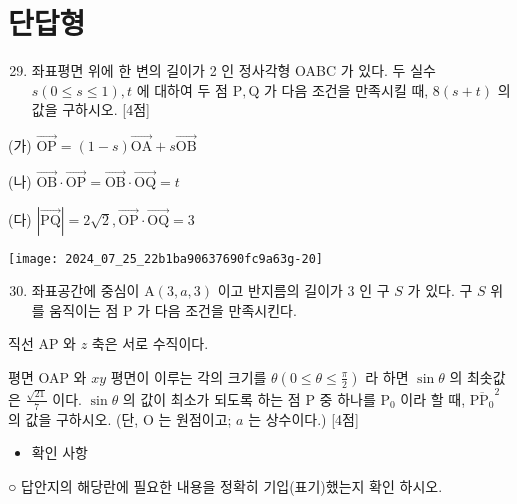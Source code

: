 \documentclass[10pt]{article}
\begin{document}
\section*{단답형}
\begin{enumerate}
  \setcounter{enumi}{28}
  \item 좌표평면 위에 한 변의 길이가 2 인 정사각형 OABC 가 있다. 두 실수 $s(0 \leq s \leq 1), t$ 에 대하여 두 점 $\mathrm{P}, \mathrm{Q}$ 가 다음 조건을 만족시킬 때, $8(s+t)$ 의 값을 구하시오. [4점]
\end{enumerate}

(가) $\overrightarrow{\mathrm{OP}}=(1-s) \overrightarrow{\mathrm{OA}}+s \overrightarrow{\mathrm{OB}}$

(나) $\overrightarrow{\mathrm{OB}} \cdot \overrightarrow{\mathrm{OP}}=\overrightarrow{\mathrm{OB}} \cdot \overrightarrow{\mathrm{OQ}}=t$

(다) $|\overrightarrow{\mathrm{PQ}}|=2 \sqrt{2}, \overrightarrow{\mathrm{OP}} \cdot \overrightarrow{\mathrm{OQ}}=3$

\begin{center}
\texttt{[image: 2024\_07\_25\_22b1ba90637690fc9a63g-20]}
\end{center}

\begin{enumerate}
  \setcounter{enumi}{29}
  \item 좌표공간에 중심이 $\mathrm{A}(3, a, 3)$ 이고 반지름의 길이가 3 인 구 $S$ 가 있다. 구 $S$ 위를 움직이는 점 P 가 다음 조건을 만족시킨다.
\end{enumerate}

직선 AP 와 $z$ 축은 서로 수직이다.

평면 OAP 와 $x y$ 평면이 이루는 각의 크기를 $\theta\left(0 \leq \theta \leq \frac{\pi}{2}\right)$ 라 하면 $\sin \theta$ 의 최솟값은 $\frac{\sqrt{21}}{7}$ 이다. $\sin \theta$ 의 값이 최소가 되도록 하는 점 P 중 하나를 $\mathrm{P}_{0}$ 이라 할 때, ${\overline{\mathrm{PP}_{0}}}^{2}$ 의 값을 구하시오. (단, O 는 원점이고; $a$ 는 상수이다.) [4점]

\begin{itemize}
  \item 확인 사항
\end{itemize}

○ 답안지의 해당란에 필요한 내용을 정확히 기입(표기)했는지 확인 하시오.
\end{document}
